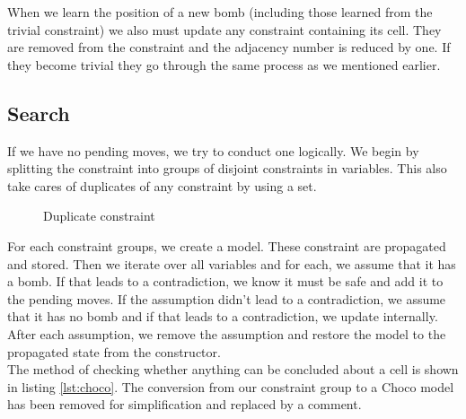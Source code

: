 \documentclass[11pt,a4paper,notitlepage]{article}
\theoremstyle{definition}
\begin{document}
When we learn the position of a new bomb (including those learned from the trivial constraint) we also must update any constraint containing its cell. They are removed from the constraint and the adjacency number is reduced by one. If they become trivial they go through the same process as we mentioned earlier.



\subsection{Search}
If we have no pending moves, we try to conduct one logically. We begin by splitting the constraint into groups of disjoint constraints in variables. This also take cares of duplicates of any constraint by using a set.\\

\begin{figure}[H]
\begin{center}
\end{center}
\caption{Duplicate constraint}
\label{fig:dc}
\end{figure}

For each constraint groups, we create a model. These constraint are propagated and stored. Then we iterate over all variables and for each, we assume that it has a bomb. If that leads to a contradiction, we know it must be safe and add it to the pending moves. If the assumption didn't lead to a contradiction, we assume that it has no bomb and if that leads to a contradiction, we update internally. After each assumption, we remove the assumption and restore the model to the propagated state from the constructor.\\

The method of checking whether anything can be concluded about a cell is shown in listing \ref{lst:choco}. The conversion from our constraint group to a Choco model has been removed for simplification and replaced by a comment.
\end{document}
